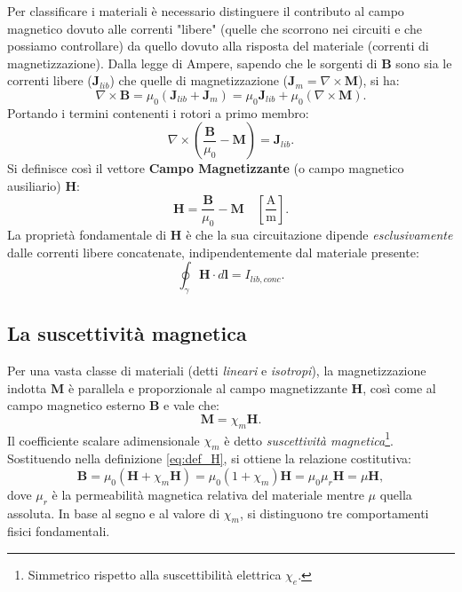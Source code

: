 \documentclass[a4paper,11pt]{report}
\begin{document}
Per classificare i materiali è necessario distinguere il contributo al campo magnetico dovuto alle correnti "libere" (quelle che scorrono nei circuiti e che possiamo controllare) da quello dovuto alla risposta del materiale (correnti di magnetizzazione). Dalla legge di Ampere, sapendo che le sorgenti di $\bm{B}$ sono sia le correnti libere ($\bm{J}_{lib}$) che quelle di magnetizzazione ($\bm{J}_m = \nabla \times \bm{M}$), si ha:
\begin{equation}
    \nabla \times \bm{B} = \mu_0 (\bm{J}_{lib} + \bm{J}_m) = \mu_0 \bm{J}_{lib} + \mu_0 (\nabla \times \bm{M}).
\end{equation}
Portando i termini contenenti i rotori a primo membro:
\begin{equation}
    \nabla \times \left( \frac{\bm{B}}{\mu_0} - \bm{M} \right) = \bm{J}_{lib}.
\end{equation}
Si definisce così il vettore \textbf{Campo Magnetizzante} (o campo magnetico ausiliario) $\bm{H}$:
\begin{equation}
    \bm{H} = \frac{\bm{B}}{\mu_0} - \bm{M} \quad \left[ \frac{\text{A}}{\text{m}} \right].
    \label{eq:def_H}
\end{equation}
La proprietà fondamentale di $\bm{H}$ è che la sua circuitazione dipende \textit{esclusivamente} dalle correnti libere concatenate, indipendentemente dal materiale presente:
\begin{equation}
    \oint_\gamma \bm{H} \cdot d\bm{l} = I_{lib, conc}.
\end{equation}



\subsection{La suscettività magnetica}
Per una vasta classe di materiali (detti \textit{lineari} e \textit{isotropi}), la magnetizzazione indotta $\bm{M}$ è parallela e proporzionale al campo magnetizzante $\bm{H}$, così come al campo magnetico esterno $\bm{B}$ e vale che:
\begin{equation}
    \bm{M} = \chi_m \bm{H}.
\end{equation}
Il coefficiente scalare adimensionale $\chi_m$ è detto \textit{suscettività magnetica}\footnote{Simmetrico rispetto alla suscettibilità elettrica $\chi_e$.}.
Sostituendo nella definizione \eqref{eq:def_H}, si ottiene la relazione costitutiva:
\begin{equation}
    \bm{B} = \mu_0 (\bm{H} + \chi_m \bm{H}) = \mu_0 (1 + \chi_m) \bm{H} = \mu_0 \mu_r \bm{H} = \mu \bm{H},
\end{equation}
dove $\mu_r$ è la permeabilità magnetica relativa del materiale mentre $\mu$ quella assoluta.
In base al segno e al valore di $\chi_m$, si distinguono tre comportamenti fisici fondamentali.
\end{document}
